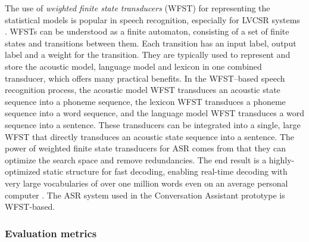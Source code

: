 \documentclass[english, 12pt, a4paper, pdftex, elec, utf8]{aaltothesis}
\begin{document}
The use of \textit{weighted finite state transducers} (WFST) for representing the statistical models is popular in speech recognition, especially for LVCSR systems \cite{hori2013speech, mohri2008speech, smit17boundaries}. WFSTs can be understood as a finite automaton, consisting of a set of finite states and transitions between them. Each transition has an input label, output label and a weight for the transition. They are typically used to represent and store the acoustic model, language model and lexicon in one combined transducer, which offers many practical benefits. In the WFST--based speech recognition process, the acoustic model WFST transduces an acoustic state sequence into a phoneme sequence, the lexicon WFST transduces a phoneme sequence into a word sequence, and the language model WFST transduces a word sequence into a sentence. These transducers can be integrated into a single, large WFST that directly transduces an acoustic state sequence into a sentence. The power of weighted finite state transducers for ASR comes from that they can optimize the search space and remove redundancies. The end result is a highly-optimized static structure for fast decoding, enabling real-time decoding with very large vocabularies of over one million words even on an average personal computer \cite[p.~4--6]{hori2013speech}. The ASR system used in the Conversation Assistant prototype is WFST-based.

\subsubsection{Evaluation metrics}
\end{document}
